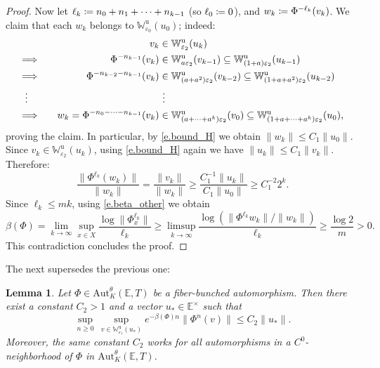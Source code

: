 \documentclass[10pt]{amsart}
\def\vcentcolon{\mathrel{\mathop\ordinarycolon}}
\providecommand\ordinarycolon{:}
\providecommand*\coloneqq{\vcentcolon\mathrel{\mkern-1.2mu}=}
\newcommand\implique{\mathchoice{\Longrightarrow}{\Rightarrow}{\Rightarrow}{\Rightarrow}}
\theoremstyle{plain}
\newtheorem{lemma}[theorem]{Lemma}
\theoremstyle{definition}
\newcommand{\EE}{\mathbb{E}}
\newcommand{\WW}{\mathbb{W}}
\newcommand{\uu}{\mathrm{u}}
\newcommand{\Aut}{\mathrm{Aut}}
\let\epsilon\varepsilon
\begin{document}
\begin{proof}
Now let $\ell_k \coloneqq n_0 + n_1 + \cdots + n_{k-1}$ (so $\ell_0 \coloneqq 0$), and $w_k \coloneqq \Phi^{-\ell_k}(v_k)$.
We claim that each $w_k$ belongs to $\WW^\uu_{\epsilon_0} (u_0)$;
indeed:
\begin{alignat*}{2}
&&v_k &\in \WW^\uu_{\epsilon_2}(u_k) \\
\implique\quad&&\Phi^{-n_{k-1}}(v_k) &\in \WW^\uu_{a \epsilon_2}(v_{k-1}) \subseteq \WW^\uu_{(1+a) \epsilon_2}(u_{k-1}) \\
\implique\quad&&\Phi^{-n_{k-2}-n_{k-1}}(v_k) &\in \WW^\uu_{(a+a^2) \epsilon_2}(v_{k-2}) \subseteq \WW^\uu_{(1 + a+a^2) \epsilon_2}(u_{k-2})\\
\vdots\quad\quad&&&\ \vdots \\
\implique\quad&&w_k = \Phi^{-n_{0} - \cdots -n_{k-1}}(v_k) &\in \WW^\uu_{(a+\cdots+a^k) \epsilon_2}(v_0) \subseteq \WW^\uu_{(1 + a + \cdots + a^k) \epsilon_2}(u_0),
\end{alignat*}
proving the claim.
In particular, by \eqref{e.bound_H} we obtain $\|w_k\| \le C_1 \|u_0\|$.
Since $v_k \in \WW^\uu_{\epsilon_2}(u_k)$, using \eqref{e.bound_H} again we have $\|u_k\| \le C_1 \|v_k\|$.
Therefore:
\[
\frac{\|\Phi^{\ell_k} (w_k)\|}{\|w_k\|}
= \frac{\|v_k\|}{\|w_k\|}
\ge \frac{C_1^{-1} \|u_k\|}{C_1 \|u_0\|}
\ge C_1^{-2} 2^k
.
\]
Since $\ell_k \le mk$, using \eqref{e.beta_other} we obtain
\[
\beta(\Phi) = \lim_{k \to \infty} \sup_{x\in X} \frac{ \log \|\Phi^{\ell_k}_x \|}{\ell_k}
\ge \limsup_{k \to \infty} \frac{ \log (\|\Phi^{\ell_k} w_k \|/\|w_k\|)}{\ell_k} \ge \frac{\log 2}{m} > 0.
\]
This contradiction concludes the proof.
\end{proof}

The next  supersedes the previous one:

\begin{lemma}\label{l.input}
Let $\Phi \in \Aut^\theta_K(\EE,T)$ be a fiber-bunched automorphism.
Then there exist a constant $C_2>1$ and a vector $u_* \in \EE^\times$ such that
\[
\sup_{n \ge 0} \, \sup_{v \in \WW^\uu_{\epsilon_1}(u_*)} e^{-\beta(\Phi) n} \| \Phi^n (v) \| \le C_2 \|u_*\|.
\]
Moreover, the same constant $C_2$ works for all automorphisms in a $C^0$-neighborhood of $\Phi$ in $\Aut^\theta_K(\EE,T)$.
\end{lemma}
\end{document}
